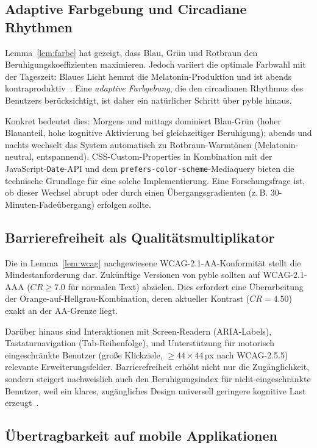 ﻿\documentclass[a4paper,12pt]{article}
\theoremstyle{definition}
\begin{document}
\subsection{Adaptive Farbgebung und Circadiane Rhythmen}

Lemma~\ref{lem:farbe} hat gezeigt, dass Blau, Grün und Rotbraun den
Beruhigungskoeffizienten maximieren. Jedoch variiert die optimale Farbwahl
mit der Tageszeit: Blaues Licht hemmt die Melatonin-Produktion und ist
abends kontraproduktiv~\cite{lockley2006}. Eine \emph{adaptive Farbgebung},
die den circadianen Rhythmus des Benutzers berücksichtigt, ist daher
ein natürlicher Schritt über pyble hinaus.

Konkret bedeutet dies: Morgens und mittags dominiert Blau-Grün (hoher
Blauanteil, hohe kognitive Aktivierung bei gleichzeitiger Beruhigung);
abends und nachts wechselt das System automatisch zu Rotbraun-Warmtönen
(Melatonin-neutral, entspannend). CSS-Custom-Properties in Kombination
mit der JavaScript-\texttt{Date}-API und dem \texttt{prefers-color-scheme}-Mediaquery
bieten die technische Grundlage für eine solche Implementierung.
Eine Forschungsfrage ist, ob dieser Wechsel abrupt oder durch einen
Übergangsgradienten (z.\,B. 30-Minuten-Fadeübergang) erfolgen sollte.

\subsection{Barrierefreiheit als Qualitätsmultiplikator}

Die in Lemma~\ref{lem:wcag} nachgewiesene WCAG-2.1-AA-Konformität
stellt die Mindestanforderung dar. Zukünftige Versionen von pyble sollten
auf WCAG-2.1-AAA ($CR \geq 7.0$ für normalen Text) abzielen. Dies erfordert
eine Überarbeitung der Orange-auf-Hellgrau-Kombination, deren aktueller
Kontrast ($CR = 4.50$) exakt an der AA-Grenze liegt.

Darüber hinaus sind Interaktionen mit Screen-Readern (ARIA-Labels),
Tastaturnavigation (Tab-Reihenfolge), und Unterstützung für motorisch
eingeschränkte Benutzer (große Klickziele, $\geq 44 \times 44$\,px nach
WCAG-2.5.5) relevante Erweiterungsfelder. Barrierefreiheit erhöht nicht
nur die Zugänglichkeit, sondern steigert nachweislich auch den
Beruhigungsindex für nicht-eingeschränkte Benutzer, weil ein klares,
zugängliches Design universell geringere kognitive Last erzeugt~\cite{henry2014}.

\subsection{Übertragbarkeit auf mobile Applikationen}
\end{document}
